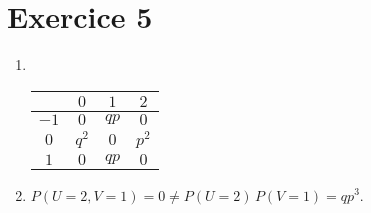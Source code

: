 \part{Exercice 5}

\begin{enumerate}
	\item~\\
		\begin{center}
			\begin{tabular}{c|ccc}
				\diagbox{$v$}{$u$}&$0$&$1$&$2$\\ \hline
				$-1$&$0$&$qp$&$0$\\[2mm]
				$0$&$q^2$&$0$&$p^2$\\[2mm]
				$1$&$0$&$qp$&$0$ \\[2mm]
			\end{tabular}
		\end{center}
	\item $P(U=2,V=1) = 0 \neq P(U=2)\,P(V=1) = qp^3$.
\end{enumerate}
